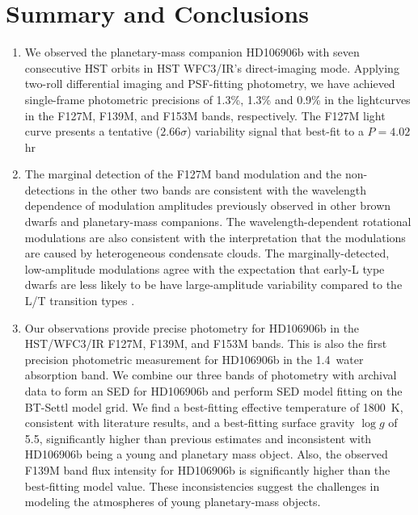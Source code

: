\documentclass[twocolumn, trackchanges]{aastex62}
\newcommand{\logg}{\ensuremath{\log(g)}\xspace}
\begin{document}
\section{Summary and Conclusions}

\begin{enumerate}
\item We observed the planetary-mass companion HD106906b with seven consecutive HST orbits in HST WFC3/IR's direct-imaging mode. Applying two-roll differential imaging and PSF-fitting photometry, we have achieved single-frame photometric precisions of 1.3\%, 1.3\% and 0.9\% in the lightcurves in the F127M, F139M, and F153M bands, respectively. The F127M light curve presents a tentative ($2.66\sigma$) variability signal that best-fit to a $P=4.02$\,hr 

\item The marginal detection of the F127M band modulation and the non-detections in the other two bands are consistent with the wavelength dependence of modulation amplitudes previously observed in other brown dwarfs and planetary-mass companions. The wavelength-dependent rotational modulations are also consistent with the interpretation that the modulations are caused by heterogeneous condensate clouds. The marginally-detected, low-amplitude modulations agree with the expectation that early-L type dwarfs are less likely to be have large-amplitude variability compared to the L/T transition types \citep[e.g.][]{Radigan2014,Metchev2015}.

\item Our observations provide precise  photometry for HD106906b in the HST/WFC3/IR F127M, F139M, and F153M bands. This is also the first precision photometric measurement for HD106906b in the 1.4\,\micron{} water absorption band. We combine our three bands of photometry with archival data to form an SED for HD106906b and perform SED model fitting on the BT-Settl model grid. We find a best-fitting effective temperature of 1800~K, consistent with literature results, and a best-fitting surface gravity $\log g$ of 5.5,  significantly higher than previous estimates and inconsistent with HD106906b being a young and planetary mass object. Also, the observed F139M band flux intensity for HD106906b is significantly higher than the best-fitting model value.
  These inconsistencies suggest the challenges in modeling the atmospheres of young planetary-mass objects.


\end{enumerate}
\end{document}

